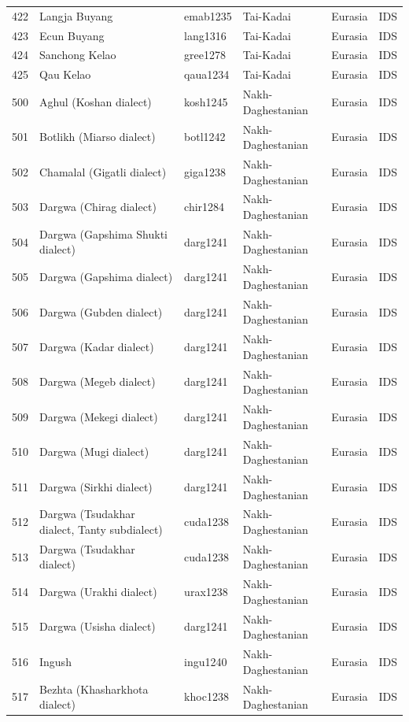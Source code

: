 \begin{table}[ht]
\begin{tabular}{rlllll}
  422 & Langja Buyang & emab1235 & Tai-Kadai & Eurasia & IDS \\ 
  423 & Ecun Buyang & lang1316 & Tai-Kadai & Eurasia & IDS \\ 
  424 & Sanchong Kelao & gree1278 & Tai-Kadai & Eurasia & IDS \\ 
  425 & Qau Kelao & qaua1234 & Tai-Kadai & Eurasia & IDS \\ 
  500 & Aghul (Koshan dialect) & kosh1245 & Nakh-Daghestanian & Eurasia & IDS \\ 
  501 & Botlikh (Miarso dialect) & botl1242 & Nakh-Daghestanian & Eurasia & IDS \\ 
  502 & Chamalal (Gigatli dialect) & giga1238 & Nakh-Daghestanian & Eurasia & IDS \\ 
  503 & Dargwa (Chirag dialect) & chir1284 & Nakh-Daghestanian & Eurasia & IDS \\ 
  504 & Dargwa (Gapshima Shukti dialect) & darg1241 & Nakh-Daghestanian & Eurasia & IDS \\ 
  505 & Dargwa (Gapshima dialect) & darg1241 & Nakh-Daghestanian & Eurasia & IDS \\ 
  506 & Dargwa (Gubden dialect) & darg1241 & Nakh-Daghestanian & Eurasia & IDS \\ 
  507 & Dargwa (Kadar dialect) & darg1241 & Nakh-Daghestanian & Eurasia & IDS \\ 
  508 & Dargwa (Megeb dialect) & darg1241 & Nakh-Daghestanian & Eurasia & IDS \\ 
  509 & Dargwa (Mekegi dialect) & darg1241 & Nakh-Daghestanian & Eurasia & IDS \\ 
  510 & Dargwa (Mugi dialect) & darg1241 & Nakh-Daghestanian & Eurasia & IDS \\ 
  511 & Dargwa (Sirkhi dialect) & darg1241 & Nakh-Daghestanian & Eurasia & IDS \\ 
  512 & Dargwa (Tsudakhar dialect, Tanty subdialect) & cuda1238 & Nakh-Daghestanian & Eurasia & IDS \\ 
  513 & Dargwa (Tsudakhar dialect) & cuda1238 & Nakh-Daghestanian & Eurasia & IDS \\ 
  514 & Dargwa (Urakhi dialect) & urax1238 & Nakh-Daghestanian & Eurasia & IDS \\ 
  515 & Dargwa (Usisha dialect) & darg1241 & Nakh-Daghestanian & Eurasia & IDS \\ 
  516 & Ingush & ingu1240 & Nakh-Daghestanian & Eurasia & IDS \\ 
  517 & Bezhta (Khasharkhota dialect) & khoc1238 & Nakh-Daghestanian & Eurasia & IDS \\ 

\end{tabular}
\end{table}
